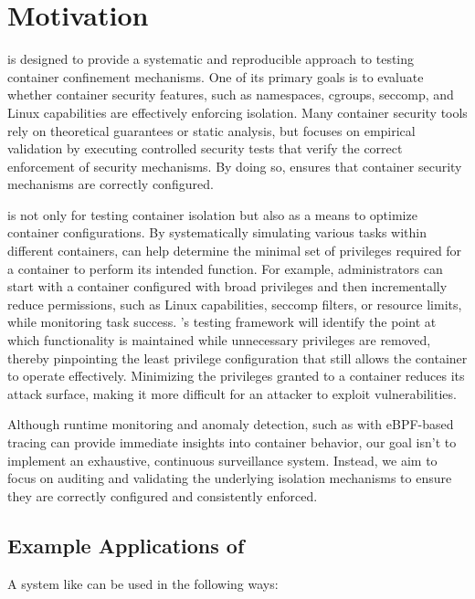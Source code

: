 \section{Motivation}
\label{sec:motivation}

\houdini is designed to provide a systematic and reproducible approach to testing container confinement mechanisms. One of its primary goals is to evaluate whether container security features, such as namespaces, cgroups, seccomp, and Linux capabilities are effectively enforcing isolation. Many container security tools rely on theoretical guarantees or static analysis\cite{clair}, but \houdini focuses on empirical validation by executing controlled security tests that verify the correct enforcement of security mechanisms. By doing so, \houdini ensures that container security mechanisms are correctly configured.

\houdini is not only for testing container isolation but also as a means to optimize container configurations. By systematically simulating various tasks within different containers, \houdini can help determine the minimal set of privileges required for a container to perform its intended function. For example, administrators can start with a container configured with broad privileges and then incrementally reduce permissions, such as Linux capabilities, seccomp filters, or resource limits, while monitoring task success. \houdini’s testing framework will identify the point at which functionality is maintained while unnecessary privileges are removed, thereby pinpointing the least privilege configuration that still allows the container to operate effectively. Minimizing the privileges granted to a container reduces its attack surface, making it more difficult for an attacker to exploit vulnerabilities.

Although runtime monitoring and anomaly detection, such as with eBPF-based tracing\cite{findlay2021bpfcontain} can provide immediate insights into container behavior, our goal isn't to implement an exhaustive, continuous surveillance system. Instead, we aim to focus on auditing and validating the underlying isolation mechanisms to ensure they are correctly configured and consistently enforced.

\subsection{Example Applications of \houdini}
A system like \houdini can be used in the following ways: 

